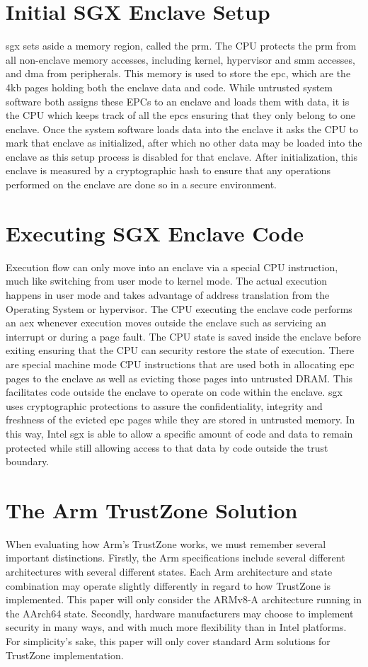 \section{Initial SGX Enclave Setup}
\gls{sgx} sets aside a memory region, called the \gls{prm}. The CPU protects the \gls{prm} from all non-enclave memory accesses, including kernel, hypervisor and \gls{smm} accesses, and \gls{dma} from peripherals\cite{Costan2016IntelSE}. This memory is used to store the \gls{epc}, which are the 4kb pages holding both the enclave data and code. While untrusted system software both assigns these EPCs to an enclave and loads them with data, it is the CPU which keeps track of all the \gls{epc}s ensuring that they only belong to one enclave. Once the system software loads data into the enclave it asks the CPU to mark that enclave as initialized, after which no other data may be loaded into the enclave as this setup process is disabled for that enclave. After initialization, this enclave is measured by a cryptographic hash to ensure that any operations performed on the enclave are done so in a secure environment.
\section{Executing SGX Enclave Code}
Execution flow can only move into an enclave via a special CPU instruction, much like switching from user mode to kernel mode. The actual execution happens in user mode and takes advantage of address translation from the Operating System or hypervisor. The CPU executing the enclave code performs an \gls{aex} whenever execution moves outside the enclave such as servicing an interrupt or during a page fault. The CPU state is saved inside the enclave before exiting ensuring that the CPU can security restore the state of execution. There are special machine mode CPU instructions that are used both in allocating \gls{epc} pages to the enclave as well as evicting those pages into untrusted DRAM. This facilitates code outside the enclave to operate on code within the enclave. \gls{sgx} uses cryptographic protections to assure the confidentiality, integrity and freshness of the evicted \gls{epc} pages while they are stored in untrusted memory\cite{Costan2016IntelSE}. In this way, Intel \gls{sgx} is able to allow a specific amount of code and data to remain protected while still allowing access to that data by code outside the trust boundary.
\section{The Arm TrustZone Solution}
When evaluating how Arm’s TrustZone works, we must remember several important distinctions. Firstly, the Arm specifications include several different architectures with several different states. Each Arm architecture and state combination may operate slightly differently in regard to how TrustZone is implemented. This paper will only consider the ARMv8-A architecture running in the AArch64 state. Secondly, hardware manufacturers may choose to implement security in many ways, and with much more flexibility than in Intel platforms. For simplicity’s sake, this paper will only cover standard Arm solutions for TrustZone implementation.
 
